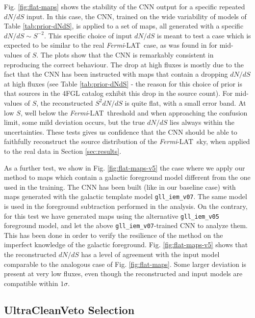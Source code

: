 \documentclass[a4paper,11pt]{article}
\newcommand{\fermi}{\textsl{Fermi}-LAT\ }
\newcommand{\dnds}{dN/dS }
\begin{document}
Fig. \ref{fig:flat-maps} shows the stability of the CNN output for a specific repeated $\dnds$ input.
In this case, the CNN, trained on the wide variability of models of Table \ref{tab:prior-dNdS}, is applied to a set of maps, all generated with a specific $\dnds \sim S^{-2}$. This specific choice of input $\dnds$ is meant to test a case which is expected to be similar to the real \fermi case, as was found in \cite{Cuoco-1pdf} for mid-values of $S$. The plots show that the CNN is remarkably consistent in reproducing the correct behaviour. The drop at high fluxes is mostly due to the fact that the CNN has been instructed with maps that contain a dropping $\dnds$ at high fluxes (see Table \ref{tab:prior-dNdS} - the reason for this choice of prior is that sources in the 4FGL catalog exhibit this drop in the source count). For mid-values of $S$, the reconstructed $S^2\dnds$ is quite flat, with a small error band. At low $S$, well below the \fermi threshold and when approaching the confusion limit, some mild deviation occurs, but the true $\dnds$ lies always within the uncertainties. These tests gives us confidence that the CNN should be able to faithfully reconstruct the source distribution of the \fermi sky, when applied to the real data in Section \ref{sec:results}.

As a further test, we show in Fig. \ref{fig:flat-maps-v5} the case where we apply our method to maps which contain a galactic foreground model different from the one used in the training. The CNN has been built (like in our baseline case) with maps generated with the galactic template model \verb|gll_iem_v07|. The same model is used in the foreground subtraction performed in the analysis. On the contrary, for this test we have generated maps  using the alternative \verb|gll_iem_v05| foreground model, and let the above \verb|gll_iem_v07|-trained CNN to analyze them. This has been done in order to verify the resilience of the method on the imperfect knowledge of the galactic foreground. Fig. \ref{fig:flat-maps-v5} shows that the reconstructed $\dnds$ has a level of agreement with the input model comparable to the analogous case of Fig. \ref{fig:flat-maps}. Some larger deviation is present at very low fluxes, even though the reconstructed and input models are compatible within $1\sigma$.




\subsection{UltraCleanVeto Selection} 
\end{document}

